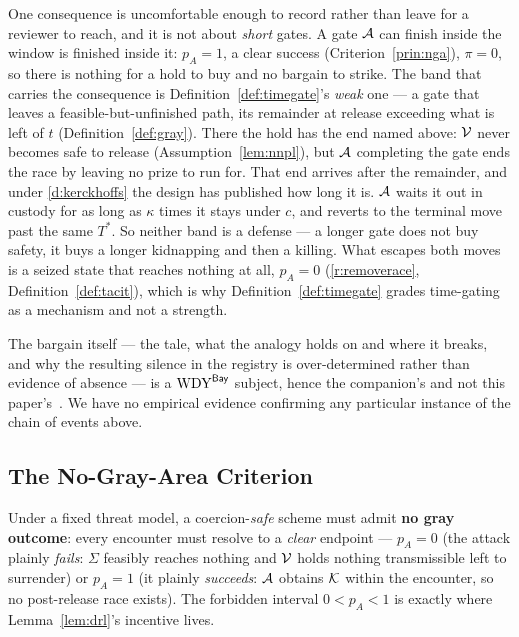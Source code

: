 \begin{remark}
One consequence is uncomfortable enough to record rather than leave for a
reviewer to reach, and it is not about \emph{short} gates. A gate $\mathcal{A}$
can finish inside the window is finished inside it: $p_A = 1$, a clear success
(Criterion~\ref{prin:nga}), $\pi = 0$, so there is nothing for a hold to buy and
no bargain to strike. The band that carries the consequence is
Definition~\ref{def:timegate}'s \emph{weak} one --- a gate that leaves a
feasible-but-unfinished path, its remainder at release exceeding what is left of
$t$ (Definition~\ref{def:gray}). There the hold has the end named above:
$\mathcal{V}$ never becomes safe to release (Assumption~\ref{lem:nnpl}), but
$\mathcal{A}$ completing the gate ends the race by leaving no prize to run for.
That end arrives after the remainder, and under \ref{d:kerckhoffs} the design
has published how long it is. $\mathcal{A}$ waits it out in custody for as long as
$\kappa$ times it stays under $c$, and reverts to the terminal move past the
same $T^{*}$. So neither band is a defense --- a longer gate does not buy
safety, it buys a longer kidnapping and then a killing. What escapes both moves
is a seized state that reaches nothing at all, $p_A = 0$ (\ref{r:removerace},
Definition~\ref{def:tacit}), which is why Definition~\ref{def:timegate} grades
time-gating as a mechanism and not a strength.

The bargain itself --- the tale, what the analogy holds on and where it breaks,
and why the resulting silence in the registry is over-determined rather than
evidence of absence --- is a $\mathrm{WDY}^{\mathsf{Bay}}$ subject, hence the companion's and not
this paper's~\cite[\S4]{denial-spiral}. We have no empirical evidence
confirming any particular instance of the chain of events above.
\end{remark}

\subsection{The No-Gray-Area Criterion}
\label{sub:nga}

\begin{criterion}\label{prin:nga}
Under a fixed threat model, a coercion-\emph{safe} scheme must admit \textbf{no
gray outcome}: every encounter must resolve to a \emph{clear} endpoint ---
$p_A = 0$ (the attack plainly \emph{fails}: $\Sigma$ feasibly reaches nothing and
$\mathcal{V}$ holds nothing transmissible left to surrender) or $p_A = 1$ (it plainly
\emph{succeeds}: $\mathcal{A}$ obtains $\mathcal{K}$ within the encounter, so no post-release
race exists). The forbidden interval $0 < p_A < 1$ is exactly where
Lemma~\ref{lem:drl}'s incentive lives.
\end{criterion}

